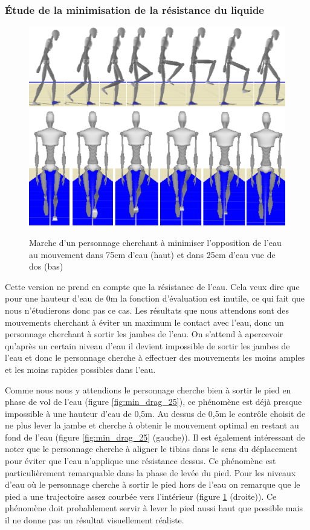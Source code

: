 \documentclass[runningheads,a4paper]{llncs}
\begin{document}
\subsubsection{Étude de la minimisation de la résistance du liquide}

\begin{figure}[h]
\centering
\includegraphics[scale=0.4]{strips/min_drag_75cm.png}
\includegraphics[scale=0.4]{strips/min_drag_25cm_from_back.png}
\caption{Marche d'un personnage cherchant à minimiser l'opposition de l'eau au mouvement dans 75cm d'eau (haut) et dans 25cm d'eau vue de dos (bas)}
\label{fig:min_drag2}
\end{figure}

Cette version ne prend en compte que la résistance de l'eau. Cela veux dire que pour une hauteur d'eau de 0m la fonction d'évaluation est inutile, ce qui fait que nous n'étudierons donc pas ce cas. Les résultats que nous attendons sont des mouvements cherchant à éviter un maximum le contact avec l'eau, donc un personnage cherchant à sortir les jambes de l'eau. On s'attend à apercevoir qu'après un certain niveau d'eau il devient impossible de sortir les jambes de l'eau et donc le personnage cherche à effectuer des mouvements les moins amples et les moins rapides possibles dans l'eau. 
 
Comme nous nous y attendions le personnage cherche bien à sortir le pied en phase de vol de l'eau (figure \ref{fig:min_drag_25}), ce phénomène est déjà presque impossible à une hauteur d'eau de 0,5m. Au dessus de 0,5m le contrôle choisit de ne plus lever la jambe et cherche à obtenir le mouvement optimal en restant au fond de l'eau (figure \ref{fig:min_drag_25} (gauche)). Il est également intéressant de noter que le personnage cherche à aligner le tibias dans le sens du déplacement pour éviter que l'eau n'applique une résistance dessus. Ce phénomène est particulièrement remarquable dans la phase de levée du pied. Pour les niveaux d'eau où le personnage cherche à sortir le pied hors de l'eau on remarque que le pied a une trajectoire assez courbée vers l'intérieur (figure \ref{fig:min_drag2} (droite)). Ce phénomène doit probablement servir à lever le pied aussi haut que possible mais il ne donne pas un résultat visuellement réaliste.  
\end{document}
